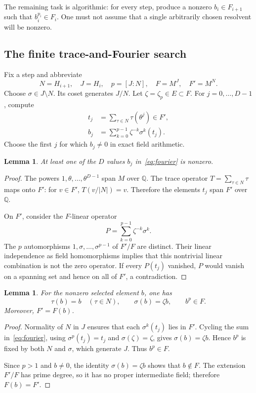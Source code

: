 \documentclass[11pt,a4paper]{article}
\newcommand{\Q}{\mathbb Q}
\newtheorem{lemma}[theorem]{Lemma}
\theoremstyle{definition}
\theoremstyle{remark}
\begin{document}
The remaining task is algorithmic: for every step, produce a nonzero $b_i\in F_{i+1}$ such that $b_i^{p_i}\in F_i$. One must not assume that a single arbitrarily chosen resolvent will be nonzero.

\subsection{The finite trace-and-Fourier search}

Fix a step and abbreviate
\[
 N=H_{i+1},\quad J=H_i,\quad p=[J:N],\quad
 F=M^J,\quad F'=M^N.
\]
Choose $\sigma\in J\setminus N$. Its coset generates $J/N$. Let $\zeta=\zeta_p\in E\subset F$. For $j=0,\ldots,D-1$, compute
\begin{align}
 t_j&=\sum_{\tau\in N}\tau(\theta^j)\in F',\label{eq:tracepowers}\\
 b_j&=\sum_{k=0}^{p-1}\zeta^{-k}\sigma^k(t_j).
 \label{eq:fourier}
\end{align}
Choose the first $j$ for which $b_j\ne0$ in exact field arithmetic.

\begin{lemma}\label{lem:nonzero}
At least one of the $D$ values $b_j$ in~\eqref{eq:fourier} is nonzero.
\end{lemma}
\begin{proof}
The powers $1,\theta,\ldots,\theta^{D-1}$ span $M$ over $\Q$. The trace operator $T=\sum_{\tau\in N}\tau$ maps onto $F'$: for $v\in F'$, $T(v/|N|)=v$. Therefore the elements $t_j$ span $F'$ over $\Q$.

On $F'$, consider the $F$-linear operator
\[
 P=\sum_{k=0}^{p-1}\zeta^{-k}\sigma^k.
\]
The $p$ automorphisms $1,\sigma,\ldots,\sigma^{p-1}$ of $F'/F$ are distinct. Their linear independence as field homomorphisms implies that this nontrivial linear combination is not the zero operator. If every $P(t_j)$ vanished, $P$ would vanish on a spanning set and hence on all of $F'$, a contradiction.
\end{proof}

\begin{lemma}\label{lem:eigen}
For the nonzero selected element $b$, one has
\[
 \tau(b)=b\quad(\tau\in N),\qquad
 \sigma(b)=\zeta b,\qquad b^p\in F.
\]
Moreover, $F'=F(b)$.
\end{lemma}
\begin{proof}
Normality of $N$ in $J$ ensures that each $\sigma^k(t_j)$ lies in $F'$. Cycling the sum in~\eqref{eq:fourier}, using $\sigma^p(t_j)=t_j$ and $\sigma(\zeta)=\zeta$, gives $\sigma(b)=\zeta b$. Hence $b^p$ is fixed by both $N$ and $\sigma$, which generate $J$. Thus $b^p\in F$.

Since $p>1$ and $b\ne0$, the identity $\sigma(b)=\zeta b$ shows that $b\notin F$. The extension $F'/F$ has prime degree, so it has no proper intermediate field; therefore $F(b)=F'$.
\end{proof}
\end{document}
